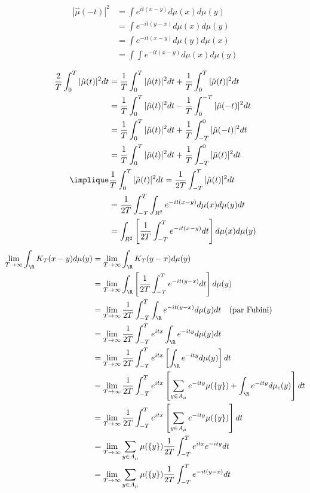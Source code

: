 \begin{align}
    |\hat{\mu}(-t)|^2 &= \int e^{it(x-y)} d\mu(x) d\mu(y) \\
    &= \int e^{-it(y-x)} d\mu(x) d\mu(y) \\
    &= \int e^{-it(x-y)} d\mu(y) d\mu(x) \\
    &= \int \int e^{-it(x-y)} d\mu(x) d\mu(y) \\
\end{align}
%
\begin{align}
    \frac{2}{T} \int_0^T |\hat{\mu}(t)|^2 dt
    &= \frac{1}{T} \int_0^T |\hat{\mu}(t)|^2 dt + \frac{1}{T} \int_0^T |\hat{\mu}(t)|^2 dt \\
    &= \frac{1}{T} \int_0^T |\hat{\mu}(t)|^2 dt - \frac{1}{T} \int_0^{-T} |\hat{\mu}(-t)|^2 dt \\
    &= \frac{1}{T} \int_0^T |\hat{\mu}(t)|^2 dt + \frac{1}{T} \int_{-T}^0 |\hat{\mu}(-t)|^2 dt \\
    &= \frac{1}{T} \int_0^T |\hat{\mu}(t)|^2 dt + \frac{1}{T} \int_{-T}^0 |\hat{\mu}(t)|^2 dt \\
    \implique & \frac{1}{T} \int_0^T |\hat{\mu}(t)|^2 dt = \frac{1}{2T} \int_{-T}^T |\hat{\mu}(t)|^2 dt \\
    &= \frac{1}{2T} \int_{-T}^T \int_{R^2} e^{-it(x-y)} d\mu(x) d\mu(y) dt \\
    &= \int_{R^2} \left[ \frac{1}{2T}  \int_{-T}^T e^{-it(x-y)} dt \right] d\mu(x) d\mu(y) \\
\end{align}
%
\begin{align}
    \lim_{T \to \infty} \int_\R K_T(x-y) d\mu(y) &= \lim_{T \to \infty} \int_\R K_T(y-x) d\mu(y) \\
    &= \lim_{T \to \infty} \int_\R \left[ \frac{1}{2T} \int_{-T}^T e^{-it(y-x)} dt \right] d\mu(y) \\
    &= \lim_{T \to \infty} \frac{1}{2T} \int_{-T}^T \int_\R  e^{-it(y-x)} d\mu(y) dt
    \quad \text{(par Fubini)} \\
%
    &= \lim_{T \to \infty} \frac{1}{2T} \int_{-T}^T  e^{itx} \int_\R  e^{-ity} d\mu(y) dt \\
    &= \lim_{T \to \infty} \frac{1}{2T} \int_{-T}^T  e^{itx}
    \left[   \int_\R  e^{-ity} d\mu(y)  \right] dt \\
%
    &= \lim_{T \to \infty} \frac{1}{2T} \int_{-T}^T  e^{itx}
    \left[   \sum_{y\in A_\mu}  e^{-ity} \mu(\{y\}) + \int_\R  e^{-ity} d\mu_c(y)  \right] dt \\
%
    &= \lim_{T \to \infty} \frac{1}{2T} \int_{-T}^T  e^{itx}
    \left[   \sum_{y\in A_\mu}  e^{-ity} \mu(\{y\})  \right] dt \\
%
    &= \lim_{T \to \infty} \sum_{y\in A_\mu} \mu(\{y\}) \frac{1}{2T}
    \int_{-T}^T  e^{itx} e^{-ity}  dt \\
%
    &= \lim_{T \to \infty} \sum_{y\in A_\mu} \mu(\{y\}) \frac{1}{2T}
    \int_{-T}^T  e^{-it(y-x)} dt \\
%
\end{align}




